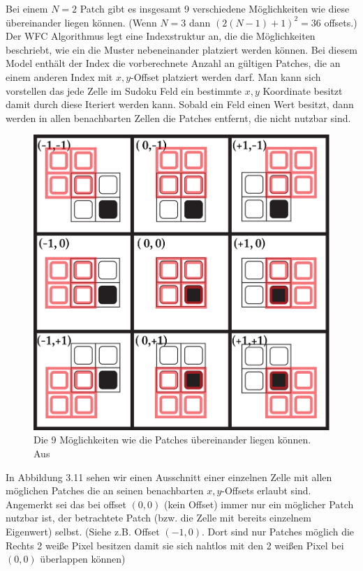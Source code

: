 \documentclass[12pt, a4paper,twoside,openright]{report} %
\begin{document}
Bei einem $N = 2$ Patch gibt es insgesamt 9 verschiedene Möglichkeiten wie diese übereinander liegen können.
{(Wenn $N = 3$ dann $(2(N - 1) + 1)^2 = 36$ offsets.)}
Der WFC Algorithmus legt eine Indexstruktur an, die die Möglichkeiten beschriebt, wie ein die Muster nebeneinander platziert werden können.
Bei diesem Model enthält der Index die vorberechnete Anzahl an gültigen Patches, die an einem anderen Index mit $x,y$-Offset platziert werden darf. 
Man kann sich vorstellen das jede Zelle im Sudoku Feld ein bestimmte $x,y$ Koordinate besitzt damit durch diese Iteriert werden kann.
Sobald ein Feld einen Wert besitzt, dann werden in allen benachbarten Zellen die Patches entfernt, die nicht nutzbar sind. \cite{Karth2017WaveFunctionCollapseIC}

\begin{figure}[H]
    \centering
    \includegraphics[width=0.5\linewidth]{images/red-maze-offset.png}%
    \caption{Die 9 Möglichkeiten wie die Patches übereinander liegen können. Aus \cite{Karth2017WaveFunctionCollapseIC}}%
\end{figure}

In Abbildung 3.11 sehen wir einen Ausschnitt einer einzelnen Zelle mit allen möglichen Patches die an seinen benachbarten $x,y$-Offsets erlaubt sind.
Angemerkt sei das bei offset $(0,0)$ {(kein Offset)} immer nur ein möglicher Patch nutzbar ist, der betrachtete Patch {(bzw. die Zelle mit bereits einzelnem Eigenwert)} selbst.
{(Siehe z.B. Offset $(-1,0)$. Dort sind nur Patches möglich die Rechts 2 weiße Pixel besitzen damit sie sich nahtlos mit den 2 weißen Pixel bei $(0,0)$ überlappen können)} \cite{Karth2017WaveFunctionCollapseIC}
\end{document}
